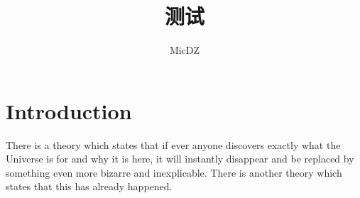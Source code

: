 \documentclass{article}
\title{测试}
\author{MicDZ}
\date{}
\begin{document}
\maketitle

\section{Introduction}
There is a theory which states that if ever anyone discovers exactly what the Universe is for and why it is here, it will instantly disappear and be replaced by something even more bizarre and inexplicable.
There is another theory which states that this has already happened.
\end{document}
